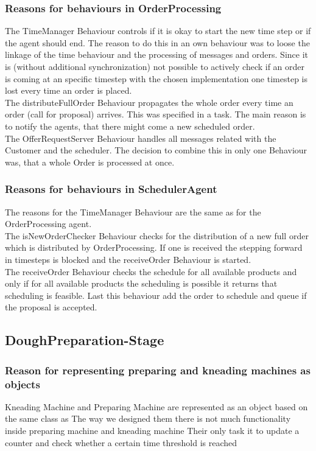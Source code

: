 \documentclass[10pt,a4paper]{article}
\begin{document}
	\subsubsection{Reasons for behaviours in OrderProcessing}
	The TimeManager Behaviour controls if it is okay to start the new time step or if the agent should end. The reason to do this in an own behaviour was to loose the linkage of the time behaviour and the processing of messages and orders. Since it is (without additional synchronization) not possible to actively check if an order is coming at an specific timestep with the chosen implementation one timestep is lost every time an order is placed.
	\\
	The distributeFullOrder Behaviour propagates the whole order every time an order (call for proposal) arrives. This was specified in a task. The main reason is to notify the agents, that there might come a new scheduled order.
	\\
	The OfferRequestServer Behaviour handles all messages related with the Customer and the scheduler. The decision to combine this in only one Behaviour was, that a whole Order is processed at once.
	
	\subsubsection{Reasons for behaviours in SchedulerAgent}
	The reasons for the TimeManager Behaviour are the same as for the OrderProcessing agent.
	\\
	The isNewOrderChecker Behaviour checks for the distribution of a new full order which is distributed by OrderProcessing. If one is received the stepping forward in timesteps is blocked and the receiveOrder Behaviour is started.
	\\
	The receiveOrder Behaviour checks the schedule for all available products and only if for all available products the scheduling is possible it returns that scheduling is feasible. Last this behaviour add the order to schedule and queue if the proposal is accepted.
	
	\subsection{DoughPreparation-Stage}
		\subsubsection{Reason for representing preparing and kneading machines as objects}
		Kneading Machine and Preparing Machine are represented as an object based on the same class as
		The way we designed them there is not much functionality inside preparing machine and kneading machine
		Their only task it to update a counter and check whether a certain time threshold is reached
\end{document}
